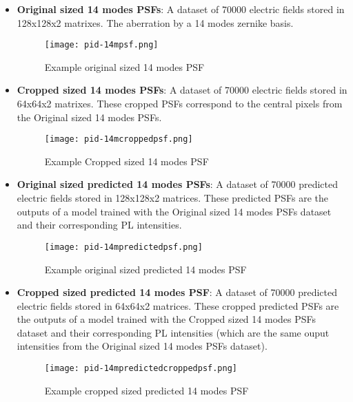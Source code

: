 \begin{itemize}
				\item \textbf{Original sized 14 modes PSFs}: A dataset of 70000 electric fields stored in 128x128x2 matrixes. The aberration by a 14 modes zernike basis.
				\begin{figure*}[ht!]
					\centering
					\texttt{[image: pid-14mpsf.png]}
					\caption{Example original sized 14 modes PSF}\hspace{\fill}
				\end{figure*}				
				\item \textbf{Cropped sized 14 modes PSFs}:  A dataset of 70000 electric fields stored in 64x64x2 matrixes. These cropped  PSFs correspond to the central pixels from the Original sized 14 modes PSFs.
				\begin{figure*}[ht!]
					\centering
					\texttt{[image: pid-14mcroppedpsf.png]}
					\caption{Example Cropped sized 14 modes PSF}\hspace{\fill}
				\end{figure*}			
				\item \textbf{Original sized predicted 14 modes PSFs}:  A dataset of 70000 predicted electric fields stored in 128x128x2 matrices. These predicted PSFs are the outputs of a model trained with the Original sized 14 modes PSFs dataset and their corresponding PL intensities.
				\begin{figure*}[ht!]
					\centering
					\texttt{[image: pid-14mpredictedpsf.png]}
					\caption{Example original sized predicted 14 modes PSF}\hspace{\fill}
				\end{figure*}			
				\item \textbf{Cropped sized predicted 14 modes PSF}: A dataset of 70000 predicted electric fields stored in 64x64x2 matrices. These cropped predicted PSFs are the outputs of a model trained with the Cropped sized 14 modes PSFs dataset and their corresponding PL intensities (which are the same ouput intensities from the Original sized 14 modes PSFs dataset).
				\begin{figure*}[ht!]
					\centering
					\texttt{[image: pid-14mpredictedcroppedpsf.png]}
					\caption{Example cropped sized predicted 14 modes PSF}\hspace{\fill}
				\end{figure*}
				\FloatBarrier
				

\end{itemize}
